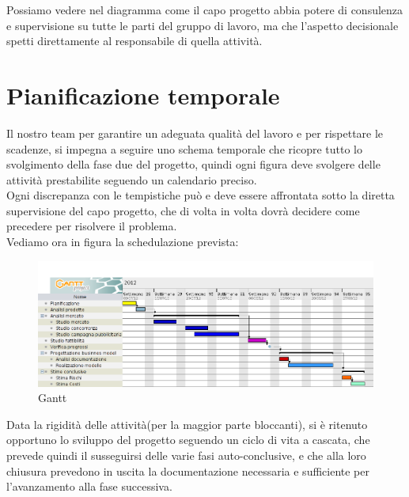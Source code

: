\vspace*{0.5cm}

Possiamo vedere nel diagramma  come il capo progetto abbia potere di consulenza e supervisione su tutte le parti del gruppo di lavoro, ma che l'aspetto decisionale spetti direttamente al responsabile di quella attività.

\newpage

\section{Pianificazione temporale}

Il nostro team per garantire un adeguata qualità del lavoro e per rispettare le scadenze, si impegna a seguire uno schema temporale che ricopre tutto lo svolgimento della fase due del progetto, quindi ogni figura deve svolgere delle attività prestabilite seguendo un calendario preciso. \\Ogni discrepanza con le tempistiche può e deve essere affrontata sotto la diretta supervisione del capo progetto, che di volta in volta dovrà decidere come precedere per risolvere il problema. \\Vediamo ora in figura  la schedulazione prevista:

\vspace*{0.5cm}

\begin{figure}[H]
\centering
\includegraphics[scale=0.4]{images/cap3/Gantt.png}
\caption{Gantt}
\end{figure}

\vspace*{0.5cm}

Data la rigidità delle attività(per la maggior parte bloccanti), si è ritenuto opportuno lo sviluppo del progetto seguendo un ciclo di vita a cascata, che prevede quindi il susseguirsi delle varie fasi auto-conclusive, e che alla loro chiusura prevedono in uscita la documentazione necessaria e sufficiente per l'avanzamento alla fase successiva.

